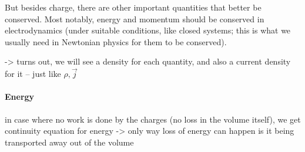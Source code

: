 \documentclass[../class_mech_main.tex]{subfiles}
\begin{document}
But besides charge, there are other important quantities that better be conserved. Most notably, energy and momentum should be conserved in electrodynamics (under suitable conditions, like closed systems; this is what we usually need in Newtonian physics for them to be conserved).

-> turns out, we will see a density for each quantity, and also a current density for it -- just like $\rho, \vec{j}$



            \paragraph{Energy}
in case where no work is done by the charges (no loss in the volume itself), we get continuity equation for energy -> only way loss of energy can happen is it being transported away out of the volume
\end{document}
